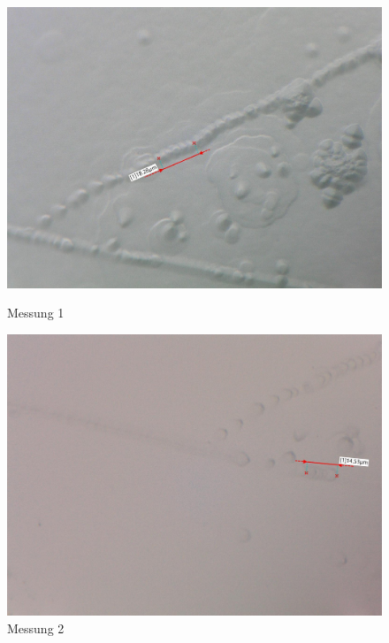 \documentclass[12pt,a4paper]{scrartcl}
\numberwithin{equation}{section} %
\begin{document}
\begin{figure}[h]
	\begin{minipage}[t]{.31\linewidth}
		\includegraphics[width=\textwidth]{../media/B2.8/KWK1_tempered.pdf}
		\caption{Messung 1}
		\label{abb:KWK1}
	\end{minipage}
	\begin{minipage}[t]{.31\linewidth}
		\includegraphics[width=\textwidth]{../media/B2.8/KWK2_tempered.pdf}
		\caption{Messung 2}
		\label{abb:KWK2}
	\end{minipage}
	\begin{minipage}[t]{.31\linewidth}

\end{minipage}
\end{figure}
\end{document}
